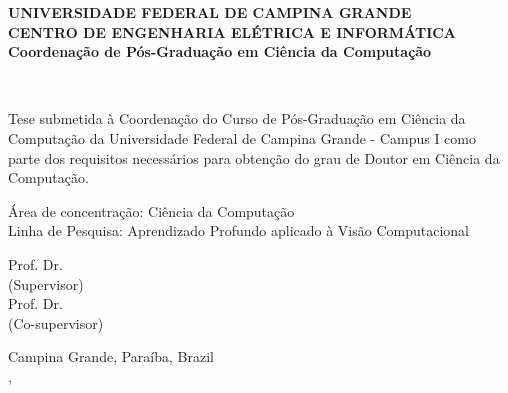 \begin{center}
\textbf{UNIVERSIDADE FEDERAL DE CAMPINA GRANDE} \\
\textbf{CENTRO DE ENGENHARIA ELÉTRICA E INFORMÁTICA} \\
\textbf{Coordenação de Pós-Graduação em Ciência da Computação}
\vspace{3em}

\Large{}
\thetitle
\vspace{3em}

\Large{\theauthor}\\
\vspace{3em}

\normalsize
\begin{flushright}
\parbox[t]{122mm}{Tese submetida à Coordenação do Curso de Pós-Graduação em Ciência da Computação da Universidade Federal de Campina Grande - Campus I como parte dos requisitos necessários para obtenção do grau de Doutor em Ciência da Computação.}
\end{flushright}
\vspace{3em}

\begin{flushleft}
Área de concentração: Ciência da Computação\\
Linha de Pesquisa: Aprendizado Profundo aplicado à Visão Computacional
\vspace{3em}
\end{flushleft}

Prof. Dr. \profa\\
(Supervisor) \\
\vspace{1em}
Prof. Dr. \profb\\
(Co-supervisor)
\vfill

Campina Grande, Paraíba, Brazil \\
\MONTH, \the\year
\end{center}